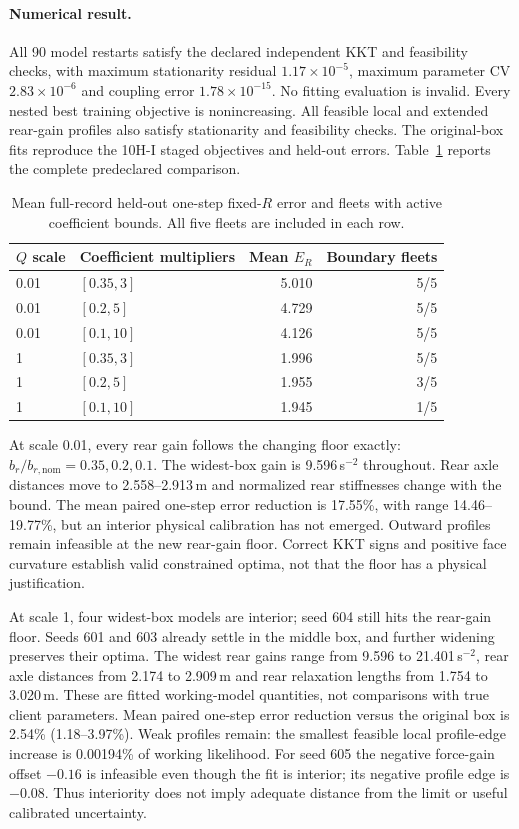 \paragraph{Numerical result.}
All 90 model restarts satisfy the declared independent KKT and feasibility
checks, with maximum stationarity residual $1.17\times10^{-5}$, maximum
parameter CV $2.83\times10^{-6}$ and coupling error
$1.78\times10^{-15}$. No fitting evaluation is invalid. Every nested best
training objective is nonincreasing. All feasible local and extended
rear-gain profiles also satisfy stationarity and feasibility checks.
The original-box fits reproduce the 10H-I staged objectives and held-out
errors. Table~\ref{tab:10hj-boxes} reports the complete predeclared comparison.

\begin{table}[htbp]
\centering
\caption{Mean full-record held-out one-step fixed-$R$ error and fleets with
active coefficient bounds. All five fleets are included in each row.}
\label{tab:10hj-boxes}
\begin{tabular}{llrr}
\toprule
$Q$ scale & Coefficient multipliers & Mean $E_R$ & Boundary fleets\\
\midrule
0.01 & $[0.35,3]$ & 5.010 & 5/5\\
0.01 & $[0.2,5]$ & 4.729 & 5/5\\
0.01 & $[0.1,10]$ & 4.126 & 5/5\\
1 & $[0.35,3]$ & 1.996 & 5/5\\
1 & $[0.2,5]$ & 1.955 & 3/5\\
1 & $[0.1,10]$ & 1.945 & 1/5\\
\bottomrule
\end{tabular}
\end{table}

At scale 0.01, every rear gain follows the changing floor exactly:
$b_r/b_{r,\mathrm{nom}}=0.35,0.2,0.1$. The widest-box gain is
9.596\,s$^{-2}$ throughout. Rear axle distances move to 2.558--2.913\,m and
normalized rear stiffnesses change with the bound. The mean paired one-step
error reduction is 17.55\%, with range 14.46--19.77\%, but an interior physical
calibration has not emerged. Outward profiles remain infeasible at the new
rear-gain floor. Correct KKT signs and positive face curvature establish
valid constrained optima, not that the floor has a physical justification.

At scale 1, four widest-box models are interior; seed 604 still hits the
rear-gain floor. Seeds 601 and 603 already settle in the middle box, and
further widening preserves their optima. The widest rear gains range from
9.596 to 21.401\,s$^{-2}$, rear axle distances from 2.174 to 2.909\,m and rear
relaxation lengths from 1.754 to 3.020\,m. These are fitted working-model
quantities, not comparisons with true client parameters. Mean paired one-step
error reduction versus the original box is 2.54\% (1.18--3.97\%).
Weak profiles remain: the smallest feasible local profile-edge increase is
0.00194\% of working likelihood. For seed 605 the negative force-gain offset
$-0.16$ is infeasible even though the fit is interior; its negative profile
edge is $-0.08$. Thus interiority does not imply adequate distance from the
limit or useful calibrated uncertainty.

